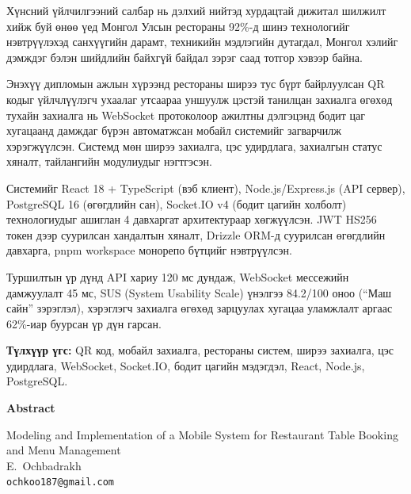 \vspace{0.4cm}
{\small
Хүнсний үйлчилгээний салбар нь дэлхий нийтэд хурдацтай дижитал шилжилт хийж буй
өнөө үед Монгол Улсын рестораны 92\%-д шинэ технологийг нэвтрүүлэхэд санхүүгийн
дарамт, техникийн мэдлэгийн дутагдал, Монгол хэлийг дэмждэг бэлэн шийдлийн
байхгүй байдал зэрэг саад тотгор хэвээр байна.

Энэхүү дипломын ажлын хүрээнд рестораны ширээ тус бүрт байрлуулсан QR кодыг
үйлчлүүлэгч ухаалаг утсаараа уншуулж цэстэй танилцан захиалга өгөхөд тухайн
захиалга нь WebSocket протоколоор ажилтны дэлгэцэнд бодит цаг хугацаанд дамждаг
бүрэн автоматжсан мобайл системийг загварчилж хэрэгжүүлсэн. Системд мөн ширээ
захиалга, цэс удирдлага, захиалгын статус хяналт, тайлангийн модулиудыг нэгтгэсэн.

Системийг React 18 + TypeScript (вэб клиент), Node.js/Express.js (API сервер),
PostgreSQL 16 (өгөгдлийн сан), Socket.IO v4 (бодит цагийн холболт) технологиудыг
ашиглан 4 давхаргат архитектураар хөгжүүлсэн. JWT HS256 токен дээр суурилсан
хандалтын хяналт, Drizzle ORM-д суурилсан өгөгдлийн давхарга, pnpm workspace
монорепо бүтцийг нэвтрүүлсэн.

Туршилтын үр дүнд API хариу 120 мс дундаж, WebSocket мессежийн дамжуулалт 45 мс,
SUS (System Usability Scale) үнэлгээ 84.2/100 оноо (``Маш сайн'' зэрэглэл),
хэрэглэгч захиалга өгөхөд зарцуулах хугацаа уламжлалт аргаас 62\%-иар буурсан
үр дүн гарсан.

\vspace{0.3cm}
\noindent\textbf{Түлхүүр үгс:} QR код, мобайл захиалга, рестораны систем, ширээ захиалга,
цэс удирдлага, WebSocket, Socket.IO, бодит цагийн мэдэгдэл, React, Node.js, PostgreSQL.
}
\clearpage

\thispagestyle{plain}
\begin{center}
{\large\bfseries Abstract}

\vspace{0.3cm}
{\normalsize Modeling and Implementation of a Mobile System for Restaurant Table Booking and Menu Management}\\[6pt]
{\normalsize E.~Ochbadrakh}\\
{\small \texttt{ochkoo187@gmail.com}}
\end{center}

